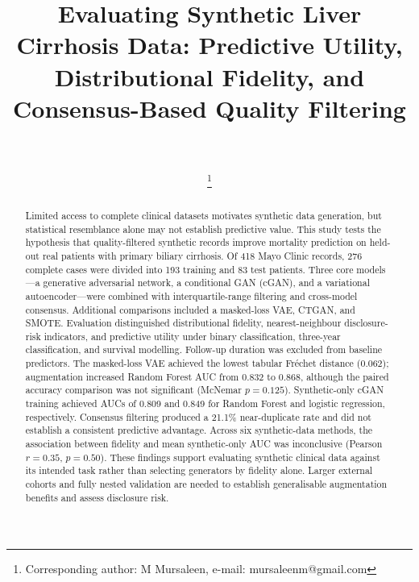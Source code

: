 \documentclass[journal]{IEEEtran}
\begin{document}
\title{Evaluating Synthetic Liver Cirrhosis Data: Predictive Utility, Distributional Fidelity, and Consensus-Based Quality Filtering}

\author{\\
\\
\thanks{Corresponding author: M Mursaleen, e-mail: mursaleenm@gmail.com}}

\maketitle

\begin{abstract}
Limited access to complete clinical datasets motivates synthetic data generation, but statistical resemblance alone may not establish predictive value. This study tests the hypothesis that quality-filtered synthetic records improve mortality prediction on held-out real patients with primary biliary cirrhosis. Of 418 Mayo Clinic records, 276 complete cases were divided into 193 training and 83 test patients. Three core models---a generative adversarial network, a conditional GAN (cGAN), and a variational autoencoder---were combined with interquartile-range filtering and cross-model consensus. Additional comparisons included a masked-loss VAE, CTGAN, and SMOTE. Evaluation distinguished distributional fidelity, nearest-neighbour disclosure-risk indicators, and predictive utility under binary classification, three-year classification, and survival modelling. Follow-up duration was excluded from baseline predictors. The masked-loss VAE achieved the lowest tabular Fr\'{e}chet distance (0.062); augmentation increased Random Forest AUC from 0.832 to 0.868, although the paired accuracy comparison was not significant (McNemar $p=0.125$). Synthetic-only cGAN training achieved AUCs of 0.809 and 0.849 for Random Forest and logistic regression, respectively. Consensus filtering produced a 21.1\% near-duplicate rate and did not establish a consistent predictive advantage. Across six synthetic-data methods, the association between fidelity and mean synthetic-only AUC was inconclusive (Pearson $r=0.35$, $p=0.50$). These findings support evaluating synthetic clinical data against its intended task rather than selecting generators by fidelity alone. Larger external cohorts and fully nested validation are needed to establish generalisable augmentation benefits and assess disclosure risk.

\end{abstract}
\end{document}
